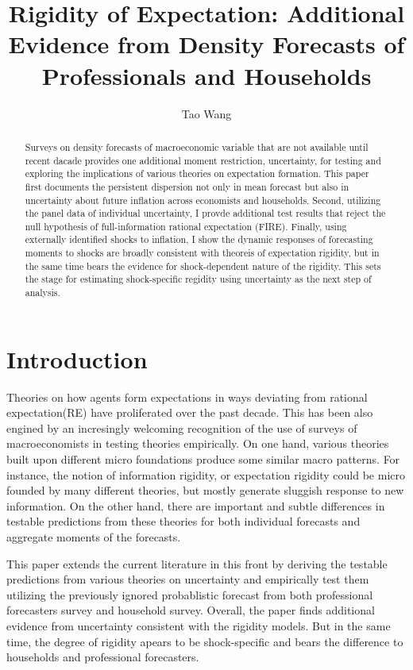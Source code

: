\documentclass[]{article}
\title{Rigidity of Expectation: Additional Evidence from Density Forecasts of Professionals and Households}
\author{Tao Wang}
\begin{document}
\maketitle

\begin{abstract}
	Surveys on density forecasts of macroeconomic variable that are not available until recent dacade provides one additional moment restriction, uncertainty, for testing and exploring the implications of various theories on expectation formation. This paper first documents the persistent dispersion not only in mean forecast but also in uncertainty about future inflation across economists and households. Second,  utilizing the panel data of individual uncertainty, I provde additional test results that reject the null hypothesis of full-information rational expectation (FIRE). Finally, using externally identified shocks to inflation, I show the dynamic responses of forecasting moments to shocks are broadly consistent with theoreis of expectation rigidity, but in the same time bears the evidence for shock-dependent nature of the rigidity.  This sets the stage for estimating shock-specific regidity using uncertainty as the next step of analysis.  
	
\end{abstract}

\newpage 

\section{Introduction}


Theories on how agents form expectations in ways deviating from rational expectation(RE) have proliferated over the past decade. This has been also engined by an incresingly welcoming recognition of the use of surveys of macroeconomists in testing theories empirically.  On one hand, various theories built upon different micro foundations produce some similar macro patterns. For instance, the notion of information rigidity, or expectation rigidity could be micro founded by many different theories, but mostly generate sluggish response to new information.  On the other hand, there are important and subtle differences in testable predictions from these theories for both individual forecasts and aggregate moments of the forecasts. 

This paper extends the current literature in this front by deriving the testable predictions from various theories on uncertainty and empirically test them utilizing the previously ignored probablistic forecast from both professional forecasters survey and household survey. Overall, the paper finds additional evidence from uncertainty consistent with the rigidity models. But in the same time, the degree of rigidity apears to be shock-specific and bears the difference to households and professional forecasters. 
\end{document}
